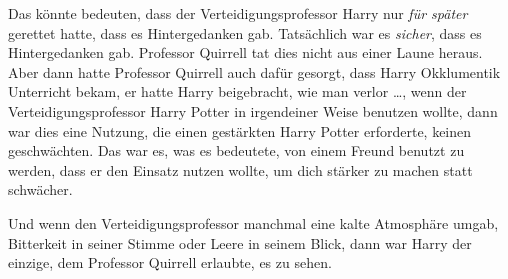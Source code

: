 Das könnte bedeuten, dass der Verteidigungsprofessor Harry nur \emph{für später} gerettet hatte, dass es Hintergedanken gab. Tatsächlich war es \emph{sicher}, dass es Hintergedanken gab. Professor Quirrell tat dies nicht aus einer Laune heraus. Aber dann hatte Professor Quirrell auch dafür gesorgt, dass Harry Okklumentik Unterricht bekam, er hatte Harry beigebracht, wie man verlor …, wenn der Verteidigungsprofessor Harry Potter in irgendeiner Weise benutzen wollte, dann war dies eine Nutzung, die einen gestärkten Harry Potter erforderte, keinen geschwächten. Das war es, was es bedeutete, von einem Freund benutzt zu werden, dass er den Einsatz nutzen wollte, um dich stärker zu machen statt schwächer.

Und wenn den Verteidigungsprofessor manchmal eine kalte Atmosphäre umgab, Bitterkeit in seiner Stimme oder Leere in seinem Blick, dann war Harry der einzige, dem Professor Quirrell erlaubte, es zu sehen.

